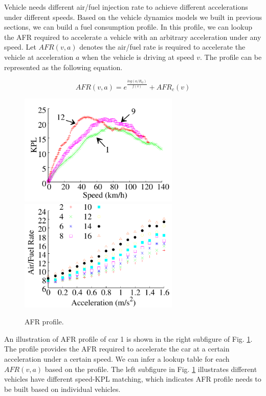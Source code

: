 Vehicle needs different air/fuel injection rate to achieve
different accelerations under different speeds. 
Based on the vehicle dynamics models we built in 
previous sections, we can build a fuel consumption profile. 
In this profile, we can lookup the AFR required to accelerate
a vehicle with an arbitrary acceleration under any speed. 
Let $AFR(v, a)$ denotes the air/fuel rate is required to 
accelerate the vehicle at acceleration $a$ when the vehicle
is driving at speed $v$. 
The profile can be represented as the following equation. 


\begin{equation}
AFR(v, a) = e^{\frac{log(a/R_G)}{f(v)}} + AFR_c(v)
\end{equation}


\begin{figure}[!htbp]
\begin{center}
\includegraphics[width=3.0in,angle=0]{Figs/EcoDrive/speed_kpl.pdf}
\hspace{-0.4cm}
\includegraphics[width=3.0in,angle=0]{Figs/EcoDrive/acce_afr.pdf}
\hspace{-0.4cm}
\vspace{-0.3cm}
\caption{AFR profile.}
\vspace{-0.5cm}
\label{profile}
\end{center}
\end{figure}

An illustration of AFR profile of car 1 is shown in
the right subfigure of Fig. \ref{profile}. 
The profile provides the AFR required to accelerate the car
at a certain acceleration under a certain speed. 
We can infer a lookup table for each $AFR(v, a)$ based
on the profile. 
The left subfigure in Fig. \ref{profile} illustrates different
vehicles have different speed-KPL matching, 
which indicates AFR profile needs to be built
based on individual vehicles. 




 



